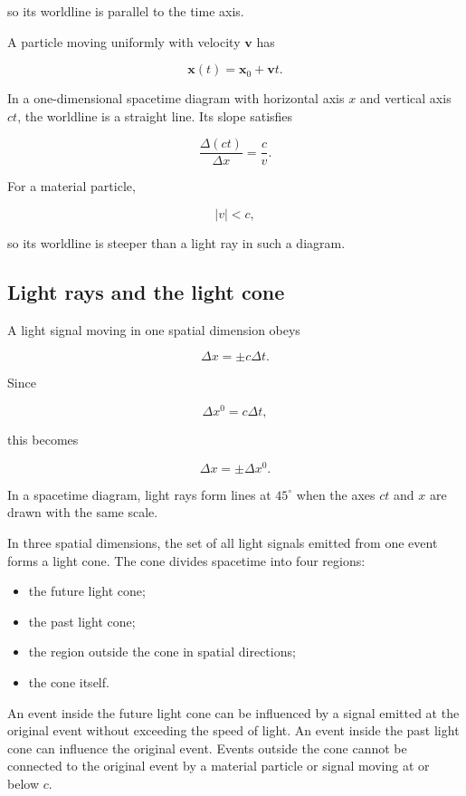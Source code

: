 so its worldline is parallel to the time axis.

A particle moving uniformly with velocity \(\mathbf{v}\) has

\[
\mathbf{x}(t)
=
\mathbf{x}_{0}+\mathbf{v}t.
\]

In a one-dimensional spacetime diagram with horizontal axis \(x\) and vertical axis \(ct\), the worldline is a straight line. Its slope satisfies

\[
\frac{\Delta(ct)}{\Delta x}
=
\frac{c}{v}.
\]

For a material particle,

\[
|v|<c,
\]

so its worldline is steeper than a light ray in such a diagram.

\subsection{Light rays and the light cone}

A light signal moving in one spatial dimension obeys

\[
\Delta x=\pm c\Delta t.
\]

Since

\[
\Delta x^{0}=c\Delta t,
\]

this becomes

\[
\Delta x=\pm\Delta x^{0}.
\]

In a spacetime diagram, light rays form lines at \(45^{\circ}\) when the axes \(ct\) and \(x\) are drawn with the same scale.

In three spatial dimensions, the set of all light signals emitted from one event forms a light cone. The cone divides spacetime into four regions:

\begin{itemize}
    \item the future light cone;
    \item the past light cone;
    \item the region outside the cone in spatial directions;
    \item the cone itself.
\end{itemize}

An event inside the future light cone can be influenced by a signal emitted at the original event without exceeding the speed of light. An event inside the past light cone can influence the original event. Events outside the cone cannot be connected to the original event by a material particle or signal moving at or below \(c\).

